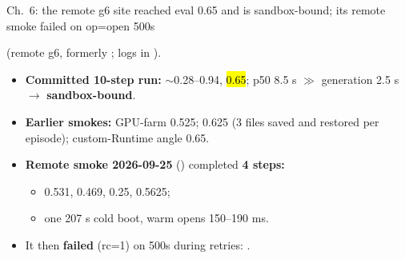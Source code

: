 \begin{frame}{Ch.\ 6: the remote g6 site reached eval 0.65 and is sandbox-bound; its remote smoke failed on op=open 500s}
{\footnotesize {}  (remote g6, formerly ; logs in ).\par}
\vspace{1mm}
\begin{itemize}\footnotesize\setlength{\itemsep}{2mm}
\item \textbf{Committed 10-step run:}  $\sim$0.28--0.94, \hl{ 0.65};  p50 8.5 s $\gg$ generation 2.5 s $\rightarrow$ \textbf{sandbox-bound}.
\item \textbf{Earlier smokes:} GPU-farm 0.525;  0.625 (3 files saved and restored per episode); custom-Runtime angle 0.65.
\item \textbf{Remote smoke 2026-09-25} () completed \textbf{4 steps:}
  \begin{itemize}\scriptsize
  \item {} 0.531, 0.469, 0.25, 0.5625;
  \item one 207 s cold boot, warm opens 150--190 ms.
  \end{itemize}
\item It then \textbf{failed} (rc=1) on  500s during  retries: .
\end{itemize}
\end{frame}


